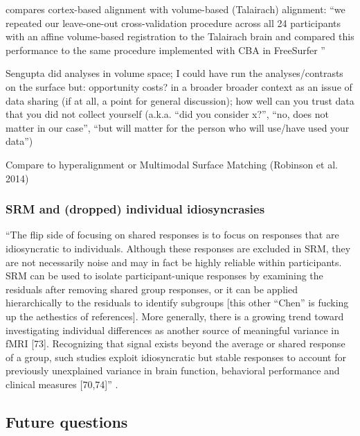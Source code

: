 \citep{weiner2018defining} compares cortex-based alignment
\citep{fischl1999high} with volume-based (Talairach) alignment: ``we repeated
our leave-one-out cross-validation procedure across all 24 participants with an
affine volume-based registration to the Talairach brain and compared this
performance to the same procedure implemented with CBA in FreeSurfer
\citep{weiner2018defining}''

Sengupta did analyses in volume space;
%
I could have run the analyses/contrasts on the surface
%
but: opportunity costs?
%
in a broader broader context as an issue of data sharing (if at all, a point for
general discussion); how well can you trust data that you did not collect
yourself (a.k.a. ``did you consider x?'', ``no, does not matter in our case'',
``but will matter for the person who will use/have used your data'')

Compare to hyperalignment or Multimodal Surface Matching (Robinson et al. 2014)


\subsubsection{SRM and (dropped) individual idiosyncrasies}

``The flip side of focusing on shared responses is to focus on responses that
are idiosyncratic to individuals.
%
Although these responses are excluded in SRM, they are not necessarily noise and
may in fact be highly reliable within participants.
%
SRM can be used to isolate participant-unique responses by examining the
residuals after removing shared group responses, or it can be applied
hierarchically to the residuals to identify subgroups \citep{chen2017shared}
\citep{cohen2017computational} [this other ``Chen'' is fucking up the aethestics
of references].
%
More generally, there is a growing trend toward investigating individual
differences as another source of meaningful variance in fMRI [73].
%
Recognizing that signal exists beyond the average or shared response of a group,
such studies exploit idiosyncratic but stable responses to account for
previously unexplained variance in brain function, behavioral performance and
clinical measures [70,74]'' \citep{cohen2017computational}.






\subsection{Future questions}

